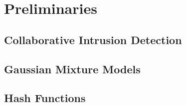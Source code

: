 \chapter{Preliminaries}


\section{Collaborative Intrusion Detection}


\section{Gaussian Mixture Models}


\section{Hash Functions}








